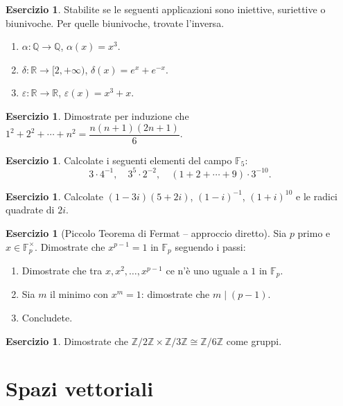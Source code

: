 \documentclass[11pt, a4paper]{book}
\theoremstyle{definition}
\newtheorem{esercizio}[definizione]{Esercizio}
\theoremstyle{plain}
\theoremstyle{remark}
\newcommand{\Z}{\mathbb{Z}}
\newcommand{\Q}{\mathbb{Q}}
\newcommand{\R}{\mathbb{R}}
\begin{document}
\begin{esercizio}
Stabilite se le seguenti applicazioni sono iniettive, suriettive o biunivoche. Per quelle biunivoche, trovate l'inversa.
\begin{enumerate}
  \item $\alpha \colon \Q \to \Q$, $\alpha(x) = x^3$.
  \item $\delta \colon \R \to [2, +\infty)$, $\delta(x) = e^x + e^{-x}$.
  \item $\varepsilon \colon \R \to \R$, $\varepsilon(x) = x^3 + x$.
\end{enumerate}
\end{esercizio}

\begin{esercizio}
Dimostrate per induzione che $1^2 + 2^2 + \cdots + n^2 = \dfrac{n(n+1)(2n+1)}{6}$.
\end{esercizio}

\begin{esercizio}
Calcolate i seguenti elementi del campo $\mathbb{F}_5$:
\[
  3 \cdot 4^{-1}, \quad 3^5 \cdot 2^{-2}, \quad (1 + 2 + \cdots + 9) \cdot 3^{-10}.
\]
\end{esercizio}

\begin{esercizio}
Calcolate $(1 - 3i)(5 + 2i)$, $(1-i)^{-1}$, $(1+i)^{10}$ e le radici quadrate di $2i$.
\end{esercizio}

\begin{esercizio}[Piccolo Teorema di Fermat -- approccio diretto]
Sia $p$ primo e $x \in \mathbb{F}_p^\times$. Dimostrate che $x^{p-1} = 1$ in $\mathbb{F}_p$ seguendo i passi:
\begin{enumerate}[label=(\alph*)]
  \item Dimostrate che tra $x, x^2, \ldots, x^{p-1}$ ce n'è uno uguale a $1$ in $\mathbb{F}_p$.
  \item Sia $m$ il minimo con $x^m = 1$: dimostrate che $m \mid (p-1)$.
  \item Concludete.
\end{enumerate}
\end{esercizio}

\begin{esercizio}
Dimostrate che $\Z/2\Z \times \Z/3\Z \cong \Z/6\Z$ come gruppi.
\end{esercizio}

\chapter{Spazi vettoriali}
\end{document}
